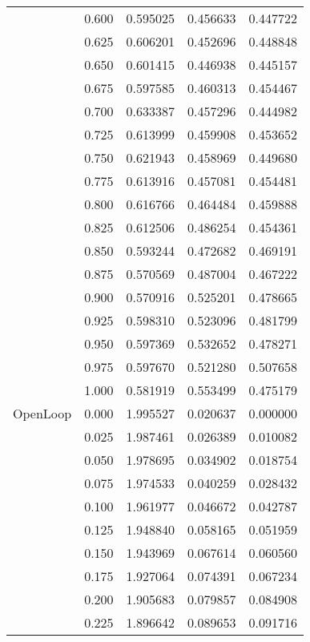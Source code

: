 \begin{tabular}{llrrr}
         & 0.600 &   0.595025 &   0.456633 &   0.447722 \\
         & 0.625 &   0.606201 &   0.452696 &   0.448848 \\
         & 0.650 &   0.601415 &   0.446938 &   0.445157 \\
         & 0.675 &   0.597585 &   0.460313 &   0.454467 \\
         & 0.700 &   0.633387 &   0.457296 &   0.444982 \\
         & 0.725 &   0.613999 &   0.459908 &   0.453652 \\
         & 0.750 &   0.621943 &   0.458969 &   0.449680 \\
         & 0.775 &   0.613916 &   0.457081 &   0.454481 \\
         & 0.800 &   0.616766 &   0.464484 &   0.459888 \\
         & 0.825 &   0.612506 &   0.486254 &   0.454361 \\
         & 0.850 &   0.593244 &   0.472682 &   0.469191 \\
         & 0.875 &   0.570569 &   0.487004 &   0.467222 \\
         & 0.900 &   0.570916 &   0.525201 &   0.478665 \\
         & 0.925 &   0.598310 &   0.523096 &   0.481799 \\
         & 0.950 &   0.597369 &   0.532652 &   0.478271 \\
         & 0.975 &   0.597670 &   0.521280 &   0.507658 \\
         & 1.000 &   0.581919 &   0.553499 &   0.475179 \\
OpenLoop & 0.000 &   1.995527 &   0.020637 &   0.000000 \\
         & 0.025 &   1.987461 &   0.026389 &   0.010082 \\
         & 0.050 &   1.978695 &   0.034902 &   0.018754 \\
         & 0.075 &   1.974533 &   0.040259 &   0.028432 \\
         & 0.100 &   1.961977 &   0.046672 &   0.042787 \\
         & 0.125 &   1.948840 &   0.058165 &   0.051959 \\
         & 0.150 &   1.943969 &   0.067614 &   0.060560 \\
         & 0.175 &   1.927064 &   0.074391 &   0.067234 \\
         & 0.200 &   1.905683 &   0.079857 &   0.084908 \\
         & 0.225 &   1.896642 &   0.089653 &   0.091716 \\

\end{tabular}
